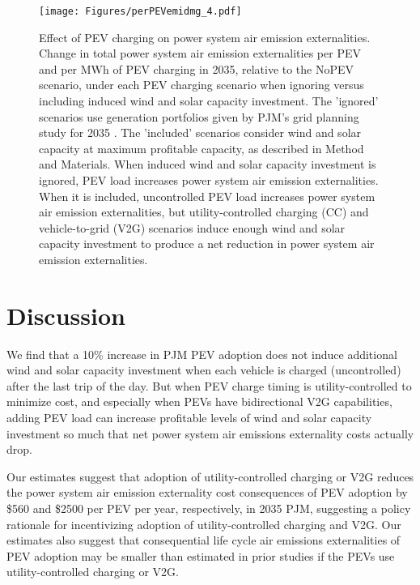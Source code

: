 \documentclass[9pt,twocolumn,twoside,lineno]{pnas-new}
\begin{document}
\begin{figure*}
\centering
\texttt{[image: Figures/perPEVemidmg\_4.pdf]}
\caption{Effect of PEV charging on power system air emission externalities. Change in total power system air emission externalities per PEV and per MWh of PEV charging in 2035, relative to the NoPEV scenario, under each PEV charging scenario when ignoring versus including induced wind and solar capacity investment. The 'ignored' scenarios use generation portfolios given by PJM's grid planning study for 2035 \cite{pjm_energy_2021}. The 'included' scenarios consider wind and solar capacity at maximum profitable capacity, as described in Method and Materials. When induced wind and solar capacity investment is ignored, PEV load increases power system air emission externalities. When it is included, uncontrolled PEV load increases power system air emission externalities, but utility-controlled charging (CC) and vehicle-to-grid (V2G) scenarios induce enough wind and solar capacity investment to produce a net reduction in power system air emission externalities.}
\label{fig:emissionsperPEV}
\end{figure*}



\section*{Discussion}

We find that a 10\% increase in PJM PEV adoption does not induce additional wind and solar capacity investment when each vehicle is charged (uncontrolled) after the last trip of the day. But when PEV charge timing is utility-controlled to minimize cost, and especially when PEVs have bidirectional V2G capabilities, adding PEV load can increase profitable levels of wind and solar capacity investment so much that net power system air emissions externality costs actually drop. 

Our estimates suggest that adoption of utility-controlled charging or V2G reduces the power system air emission externality cost consequences of PEV adoption by \$560 and \$2500 per PEV per year, respectively, in 2035 PJM, suggesting a policy rationale for incentivizing adoption of utility-controlled charging and V2G. Our estimates also suggest that consequential life cycle air emissions externalities of PEV adoption may be smaller than estimated in prior studies \cite{bruchon_cleaning_2024} if the PEVs use utility-controlled charging or V2G.
\end{document}
